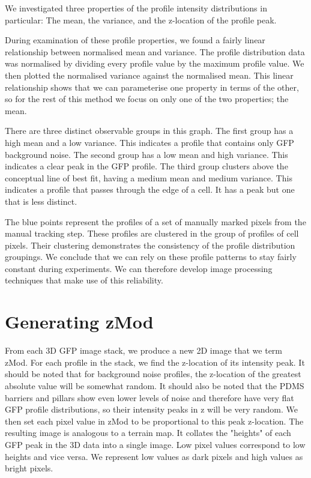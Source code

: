 We investigated three properties of the profile intensity distributions in particular: The mean, the variance, and the z-location of the profile peak.


During examination of these profile properties, we found a fairly linear relationship between normalised mean and variance. The profile distribution data was normalised by dividing every profile value by the maximum profile value. We then plotted the normalised variance against the normalised mean. This linear relationship shows that we can parameterise one property in terms of the other, so for the rest of this method we focus on only one of the two properties; the mean.

There are three distinct observable groups in this graph. The first group has a high mean and a low variance. This indicates a profile that contains only GFP background noise. The second group has a low mean and high variance. This indicates a clear peak in the GFP profile. The third group clusters above the conceptual line of best fit, having a medium mean and medium variance. This indicates a profile that passes through the edge of a cell. It has a peak but one that is less distinct.

The blue points represent the profiles of a set of manually marked pixels from the manual tracking step. These profiles are clustered in the group of profiles of cell pixels. Their clustering demonstrates the consistency of the profile distribution groupings. We conclude that we can rely on these profile patterns to stay fairly constant during experiments. We can therefore develop image processing techniques that make use of this reliability.

\section{Generating zMod}

From each 3D GFP image stack, we produce a new 2D image that we term zMod. For each profile in the stack, we find the z-location of its intensity peak. It should be noted that for background noise profiles, the z-location of the greatest absolute value will be somewhat random. It should also be noted that the PDMS barriers and pillars show even lower levels of noise and therefore have very flat GFP profile distributions, so their intensity peaks in z will be very random. We then set each pixel value in zMod to be proportional to this peak z-location. The resulting image is analogous to a terrain map. It collates the "heights" of each GFP peak in the 3D data into a single image. Low pixel values correspond to low heights and vice versa. We represent low values as dark pixels and high values as bright pixels.

